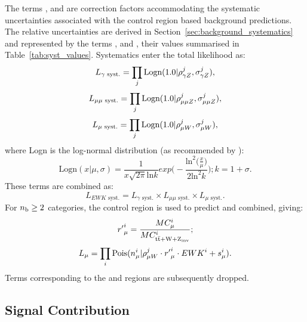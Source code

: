 The terms \rhopz, \rhommz and \rhomw are correction factors accommodating the
systematic uncertainties associated with the control region based background 
predictions. The relative uncertainties are derived in
Section~\ref{sec:background_systematics} and represented by the terms \sigmapz, \sigmammz
and \sigmamw, their 
values summarised in Table~\ref{tab:syst_values}. Systematics enter the total
likelihood as:
% 
\begin{equation}
L_{\gamma\text{ syst.}} = \prod_j \text{Logn}(1.0 | \rho^j_{\gamma Z}, \sigma^j_{\gamma Z}),
\end{equation}
\begin{equation}
L_{\mu\mu\text{ syst.}} = \prod_j \text{Logn}(1.0 | \rho^j_{\mu\mu Z}, \sigma^j_{\mu\mu Z}),
\end{equation}
\begin{equation}
L_{\mu\text{ syst.}} = \prod_j \text{Logn}(1.0 | \rho^j_{\mu W}, \sigma^j_{\mu W}),
\end{equation}
% 
where Logn is the log-normal distribution (as recommended by \cite{cousins-log-normal}):
% 
\begin{equation}
\text{Logn}(x|\mu, \sigma) = \frac{1}{x\sqrt{2\pi}\text{ln}k} exp \Bigg(-\frac{\text{ln}^2 \big(\frac{x}{\mu}\big)}{2\text{ln}^2k}\Bigg); \xspace k = 1+\sigma .
\end{equation}
% 
These terms are combined as:
% 
\begin{equation}
L_{EWK\text{ syst.}} = L_{\gamma\text{ syst.}} \times L_{\mu\mu\text{ syst.}} \times L_{\mu\text{ syst.}}.
\end{equation}
% 
For $n_{\text{b}} \geq 2$ categories, the \mj control region is used to predict \zinv and
\ttw combined, giving:
% 
\begin{equation}
{r'}^i_{\mu} = \frac{MC_{\mu}^i}{MC^i_{\rm{t}\bar{\rm{t}} + W + Z_{\text{inv}}}};
\end{equation}
% 
\begin{equation}
L_{\mu} = \prod_i \text{Pois}(n_{\mu}^i | \rho^j_{\mu W} \cdot {r'}_{\mu}^i \cdot {EWK}^i + s_{\mu}^i).
\end{equation}
% 
Terms corresponding to the \mmj and \gj regions are subsequently dropped.

\subsection{Signal Contribution}

